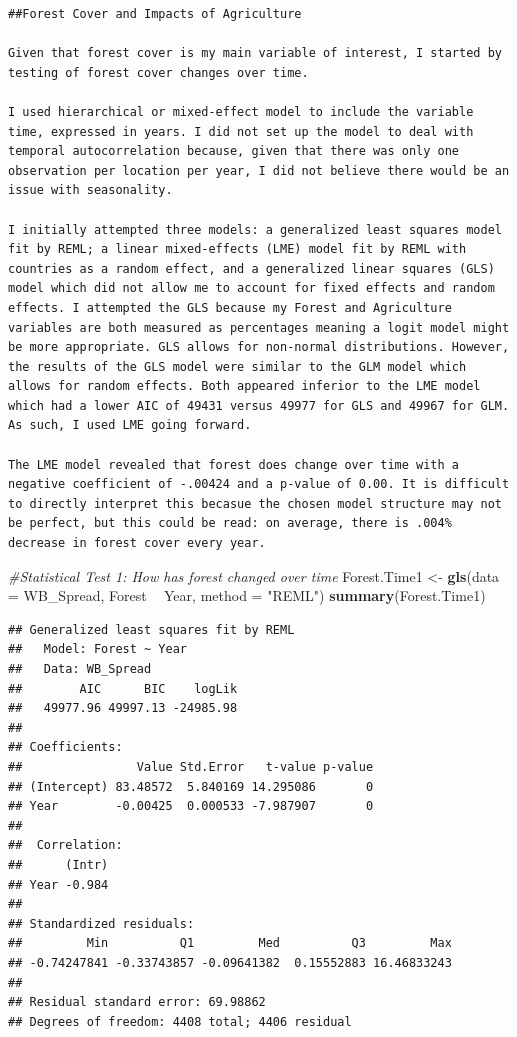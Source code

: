 \documentclass[12pt,]{article}
\newenvironment{Shaded}{\begin{snugshade}}{\end{snugshade}}
\newcommand{\KeywordTok}[1]{\textcolor[rgb]{0.13,0.29,0.53}{\textbf{#1}}}
\newcommand{\DataTypeTok}[1]{\textcolor[rgb]{0.13,0.29,0.53}{#1}}
\newcommand{\StringTok}[1]{\textcolor[rgb]{0.31,0.60,0.02}{#1}}
\newcommand{\CommentTok}[1]{\textcolor[rgb]{0.56,0.35,0.01}{\textit{#1}}}
\newcommand{\OperatorTok}[1]{\textcolor[rgb]{0.81,0.36,0.00}{\textbf{#1}}}
\newcommand{\NormalTok}[1]{#1}
\begin{document}
\begin{verbatim}
##Forest Cover and Impacts of Agriculture

Given that forest cover is my main variable of interest, I started by testing of forest cover changes over time. 
 
I used hierarchical or mixed-effect model to include the variable time, expressed in years. I did not set up the model to deal with temporal autocorrelation because, given that there was only one observation per location per year, I did not believe there would be an issue with seasonality. 

I initially attempted three models: a generalized least squares model fit by REML; a linear mixed-effects (LME) model fit by REML with countries as a random effect, and a generalized linear squares (GLS) model which did not allow me to account for fixed effects and random effects. I attempted the GLS because my Forest and Agriculture variables are both measured as percentages meaning a logit model might be more appropriate. GLS allows for non-normal distributions. However, the results of the GLS model were similar to the GLM model which allows for random effects. Both appeared inferior to the LME model which had a lower AIC of 49431 versus 49977 for GLS and 49967 for GLM. As such, I used LME going forward. 

The LME model revealed that forest does change over time with a negative coefficient of -.00424 and a p-value of 0.00. It is difficult to directly interpret this becasue the chosen model structure may not be perfect, but this could be read: on average, there is .004% decrease in forest cover every year.
\end{verbatim}

\begin{Shaded}
\begin{Highlighting}[]
\CommentTok{#Statistical Test 1: How has forest changed over time }
\NormalTok{Forest.Time1 <-}\StringTok{ }\KeywordTok{gls}\NormalTok{(}\DataTypeTok{data =}\NormalTok{ WB_Spread, }
\NormalTok{                    Forest }\OperatorTok{~}\StringTok{ }\NormalTok{Year,}
                    \DataTypeTok{method =} \StringTok{"REML"}\NormalTok{)}
\KeywordTok{summary}\NormalTok{(Forest.Time1)}
\end{Highlighting}
\end{Shaded}

\begin{verbatim}
## Generalized least squares fit by REML
##   Model: Forest ~ Year 
##   Data: WB_Spread 
##        AIC      BIC    logLik
##   49977.96 49997.13 -24985.98
## 
## Coefficients:
##                Value Std.Error   t-value p-value
## (Intercept) 83.48572  5.840169 14.295086       0
## Year        -0.00425  0.000533 -7.987907       0
## 
##  Correlation: 
##      (Intr)
## Year -0.984
## 
## Standardized residuals:
##         Min          Q1         Med          Q3         Max 
## -0.74247841 -0.33743857 -0.09641382  0.15552883 16.46833243 
## 
## Residual standard error: 69.98862 
## Degrees of freedom: 4408 total; 4406 residual
\end{verbatim}
\end{document}
